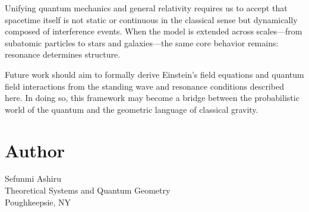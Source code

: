 \documentclass[12pt]{article}
\begin{document}
Unifying quantum mechanics and general relativity requires us to accept that spacetime itself is not static or continuous in the classical sense but dynamically composed of interference events. When the model is extended across scales---from subatomic particles to stars and galaxies---the same core behavior remains: resonance determines structure.

Future work should aim to formally derive Einstein's field equations and quantum field interactions from the standing wave and resonance conditions described here. In doing so, this framework may become a bridge between the probabilistic world of the quantum and the geometric language of classical gravity.

\section*{Author}
Sefunmi Ashiru\\Theoretical Systems and Quantum Geometry\\Poughkeepsie, NY
\end{document}
